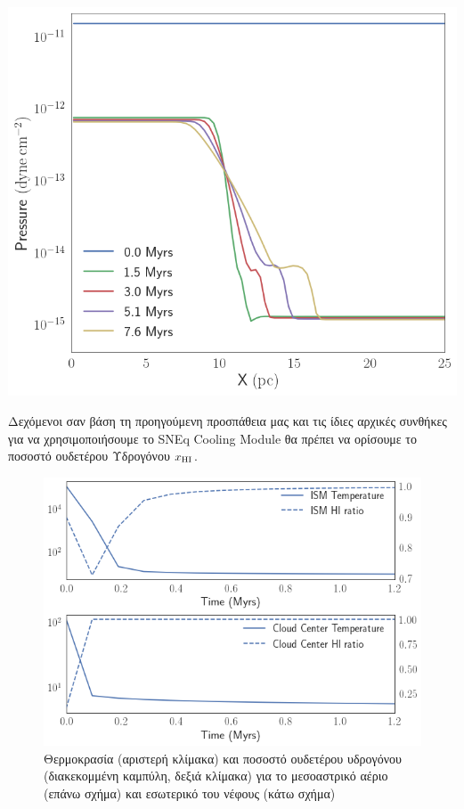 \begin{marginfigure}
	\centering
	\includegraphics[width=1\linewidth]{DataImages/SNCoolingPRSprofile}
	\caption{}
	\label{fig:sncoolingprsprofile}
\end{marginfigure}
	
	Δεχόμενοι σαν βάση τη προηγούμενη προσπάθεια μας και τις ίδιες αρχικές συνθήκες για να χρησιμοποιήσουμε το SNEq Cooling Module θα πρέπει να ορίσουμε το ποσοστό ουδετέρου Υδρογόνου $x_{\ce{HI}}$.
	
\begin{figure}[h]
	\centering
	\includegraphics[width=1\linewidth]{DataImages/SNCoolingTMPcenterISM}
	\caption{Θερμοκρασία (αριστερή κλίμακα) και ποσοστό ουδετέρου υδρογόνου (διακεκομμένη καμπύλη, δεξιά κλίμακα) για το μεσοαστρικό αέριο (επάνω σχήμα) και εσωτερικό του νέφους (κάτω σχήμα)}
	\label{fig:sncoolingtmpcenterism} 
\end{figure}
	
